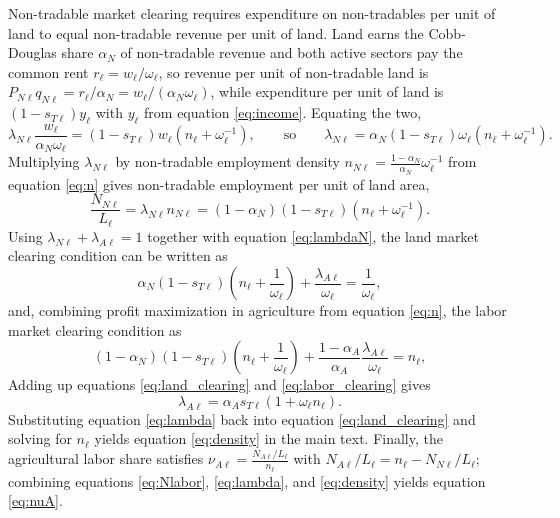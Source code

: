 \documentclass[11pt]{article}
\begin{document}
Non-tradable market clearing requires expenditure on non-tradables per unit of land to equal non-tradable revenue per unit of land. Land earns the Cobb-Douglas share $\alpha_N$ of non-tradable revenue and both active sectors pay the common rent $r_\ell=w_\ell/\omega_\ell$, so revenue per unit of non-tradable land is $P_{N\ell}q_{N\ell}=r_\ell/\alpha_N=w_\ell/(\alpha_N\omega_\ell)$, while expenditure per unit of land is $(1-s_{T\ell})y_\ell$ with $y_\ell$ from equation \eqref{eq:income}. Equating the two,
\begin{equation}
    \lambda_{N\ell}\frac{w_\ell}{\alpha_N\omega_\ell}=(1-s_{T\ell})w_\ell\left(n_\ell+\omega_\ell^{-1}\right),\qquad\text{so}\qquad\lambda_{N\ell}= \alpha_N (1-s_{T\ell}) \omega_\ell \left(n_\ell+\omega_\ell^{-1}\right).
    \label{eq:lambdaN}
\end{equation}
Multiplying $\lambda_{N\ell}$ by non-tradable employment density $n_{N\ell}=\frac{1-\alpha_N}{\alpha_N}\omega_\ell^{-1}$ from equation \eqref{eq:n} gives non-tradable employment per unit of land area,
\begin{equation}
    \frac{N_{N\ell}}{L_\ell} = \lambda_{N\ell}n_{N\ell}= (1-\alpha_N)(1-s_{T\ell})\left(n_\ell+\omega_\ell^{-1}\right).
    \label{eq:Nlabor}
\end{equation}
Using $\lambda_{N\ell}+\lambda_{A\ell}=1$ together with equation \eqref{eq:lambdaN}, the land market clearing condition can be written as
\begin{equation}
    \alpha_N(1-s_{T\ell})\left(n_\ell+\frac{1}{\omega_\ell}\right)
+ \frac{\lambda_{A\ell}}{\omega_\ell}= \frac{1}{\omega_\ell},
\label{eq:land_clearing}
\end{equation}
and, combining profit maximization in agriculture from equation \eqref{eq:n}, the labor market clearing condition as
\begin{equation}
    (1-\alpha_N)(1-s_{T\ell})\left(n_\ell+\frac{1}{\omega_\ell}\right)
+ \frac{1-\alpha_A}{\alpha_A}\frac{\lambda_{A\ell}}{\omega_\ell}= n_\ell,
\label{eq:labor_clearing}
\end{equation}
Adding up equations \eqref{eq:land_clearing} and \eqref{eq:labor_clearing} gives
\begin{equation}
    \lambda_{A\ell}=\alpha_A s_{T\ell}(1+\omega_\ell n_\ell).
    \label{eq:lambda}
\end{equation}
Substituting equation \eqref{eq:lambda} back into equation \eqref{eq:land_clearing} and solving for $n_\ell$ yields equation \eqref{eq:density} in the main text. Finally, the agricultural labor share satisfies $\nu_{A\ell}=\frac{N_{A\ell}/L_\ell}{n_\ell}$ with $N_{A\ell}/L_\ell = n_\ell - N_{N\ell}/L_\ell$; combining equations \eqref{eq:Nlabor}, \eqref{eq:lambda}, and \eqref{eq:density} yields equation \eqref{eq:nuA}.
\end{document}
